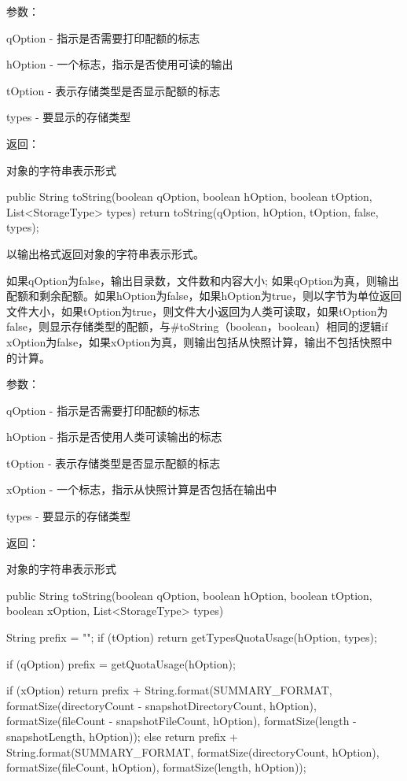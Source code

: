 参数：

qOption - 指示是否需要打印配额的标志

hOption - 一个标志，指示是否使用可读的输出

tOption - 表示存储类型是否显示配额的标志

types - 要显示的存储类型

返回：

对象的字符串表示形式

\begin{java}
public String toString(boolean qOption, boolean hOption,
                       boolean tOption, List<StorageType> types) {
  return toString(qOption, hOption, tOption, false, types);
}
\end{java}
以输出格式返回对象的字符串表示形式。

如果qOption为false，输出目录数，文件数和内容大小; 如果qOption为真，则输出配额和剩余配额。如果hOption为false，如果hOption为true，则以字节为单位返回文件大小，如果tOption为true，则文件大小返回为人类可读取，如果tOption为false，则显示存储类型的配额，与#toString（boolean，boolean）相同的逻辑if xOption为false，如果xOption为真，则输出包括从快照计算，输出不包括快照中的计算。

参数：

qOption - 指示是否需要打印配额的标志

hOption - 指示是否使用人类可读输出的标志

tOption - 表示存储类型是否显示配额的标志

xOption - 一个标志，指示从快照计算是否包括在输出中

types - 要显示的存储类型

返回：

对象的字符串表示形式

\begin{java}
public String toString(boolean qOption, boolean hOption, boolean tOption,
    boolean xOption, List<StorageType> types) {
  String prefix = "";
  if (tOption) {
    return getTypesQuotaUsage(hOption, types);
  }

  if (qOption) {
    prefix = getQuotaUsage(hOption);
  }

  if (xOption) {
    return prefix + String.format(SUMMARY_FORMAT,
        formatSize(directoryCount - snapshotDirectoryCount, hOption),
        formatSize(fileCount - snapshotFileCount, hOption),
        formatSize(length - snapshotLength, hOption));
  } else {
    return prefix + String.format(SUMMARY_FORMAT,
        formatSize(directoryCount, hOption),
        formatSize(fileCount, hOption),
        formatSize(length, hOption));
  }
}
\end{java}
